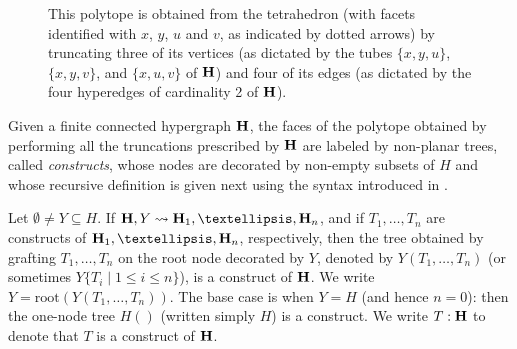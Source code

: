 \documentclass[11pt]{article}
\theoremstyle{definition}
\numberwithin{equation}{section}
\numberwithin{equation}{section}
\newcommand{\set}[1]{\{#1\}}
\newcommand{\setc}[2]{\set{#1 \mid #2}}
\newcommand{\hyper}[1]{{\bf #1}}
\begin{document}
\begin{figure}
{}


 
\caption{This polytope is obtained from the  tetrahedron (with facets identified with $x$, $y$, $u$ and $v$, as indicated by dotted arrows) by truncating three of its vertices (as dictated by the tubes $\{x,y,u\}$, $\{x,y,v\}$, and $\{x,u,v\}$ of ${\bf H}$) and four of its edges (as dictated by the four hyperedges of cardinality 2 of ${\bf H}$).  \label{hemiassoc}}
\end{figure} 
Given a finite connected hypergraph ${\bf H}$, the faces of the   polytope obtained by performing  all the truncations   prescribed by ${\bf H}$  are labeled by non-planar trees, called {\em constructs}, whose nodes are decorated by non-empty subsets of $H$ and whose recursive definition  is given next using the syntax introduced in \cite{COI}.

Let  $\emptyset\neq Y\subseteq H$. If   $\hyper{H},Y  \leadsto \hyper{H}_1,\ldots, \hyper{H}_n$, and if  $T_1,\ldots,T_n$ are constructs of $\hyper{H}_1,\ldots,\hyper{H}_n$, respectively, then the tree obtained by grafting $T_1,\ldots,T_n$ on the root node decorated by $Y$, denoted by $Y(T_1,\ldots,T_n)$ (or sometimes $Y\setc{T_i}{1\leq i\leq n}$), is a construct of  $\hyper{H}$. We write $Y=\mbox{root}(Y(T_1,\ldots,T_n))$. 
 The base case is when $Y=H$ (and hence $n=0$): then the one-node tree $H()$ (written simply $H$) is a construct.
We write $T:\hyper{H}$ to denote that $T$ is a construct of $\hyper{H}$.  
\end{document}
